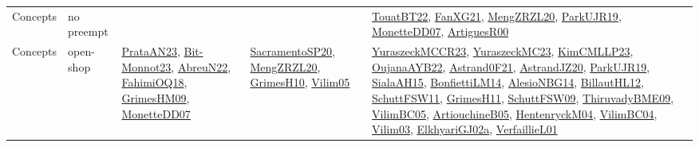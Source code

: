 {\begin{longtable}{lp{3cm}>{\raggedright}p{6cm}>{\raggedright}p{6cm}p{8cm}}
Concepts & no preempt &  &  & \href{papers/TouatBT22.pdf}{TouatBT22}\cite{TouatBT22}, \href{articles/FanXG21.pdf}{FanXG21}\cite{FanXG21}, \href{articles/MengZRZL20.pdf}{MengZRZL20}\cite{MengZRZL20}, \href{papers/ParkUJR19.pdf}{ParkUJR19}\cite{ParkUJR19}, \href{papers/MonetteDD07.pdf}{MonetteDD07}\cite{MonetteDD07}, \href{articles/ArtiguesR00.pdf}{ArtiguesR00}\cite{ArtiguesR00}\\
Concepts & open-shop & \href{articles/PrataAN23.pdf}{PrataAN23}\cite{PrataAN23}, \href{papers/Bit-Monnot23.pdf}{Bit-Monnot23}\cite{Bit-Monnot23}, \href{articles/AbreuN22.pdf}{AbreuN22}\cite{AbreuN22}, \href{articles/FahimiOQ18.pdf}{FahimiOQ18}\cite{FahimiOQ18}, \href{papers/GrimesHM09.pdf}{GrimesHM09}\cite{GrimesHM09}, \href{papers/MonetteDD07.pdf}{MonetteDD07}\cite{MonetteDD07} & \href{articles/SacramentoSP20.pdf}{SacramentoSP20}\cite{SacramentoSP20}, \href{articles/MengZRZL20.pdf}{MengZRZL20}\cite{MengZRZL20}, \href{papers/GrimesH10.pdf}{GrimesH10}\cite{GrimesH10}, \href{papers/Vilim05.pdf}{Vilim05}\cite{Vilim05} & \href{articles/YuraszeckMCCR23.pdf}{YuraszeckMCCR23}\cite{YuraszeckMCCR23}, \href{papers/YuraszeckMC23.pdf}{YuraszeckMC23}\cite{YuraszeckMC23}, \href{papers/KimCMLLP23.pdf}{KimCMLLP23}\cite{KimCMLLP23}, \href{papers/OujanaAYB22.pdf}{OujanaAYB22}\cite{OujanaAYB22}, \href{papers/Astrand0F21.pdf}{Astrand0F21}\cite{Astrand0F21}, \href{articles/AstrandJZ20.pdf}{AstrandJZ20}\cite{AstrandJZ20}, \href{papers/ParkUJR19.pdf}{ParkUJR19}\cite{ParkUJR19}, \href{papers/SialaAH15.pdf}{SialaAH15}\cite{SialaAH15}, \href{papers/BonfiettiLM14.pdf}{BonfiettiLM14}\cite{BonfiettiLM14}, \href{papers/AlesioNBG14.pdf}{AlesioNBG14}\cite{AlesioNBG14}, \href{papers/BillautHL12.pdf}{BillautHL12}\cite{BillautHL12}, \href{articles/SchuttFSW11.pdf}{SchuttFSW11}\cite{SchuttFSW11}, \href{papers/GrimesH11.pdf}{GrimesH11}\cite{GrimesH11}, \href{papers/SchuttFSW09.pdf}{SchuttFSW09}\cite{SchuttFSW09}, \href{papers/ThiruvadyBME09.pdf}{ThiruvadyBME09}\cite{ThiruvadyBME09}, \href{articles/VilimBC05.pdf}{VilimBC05}\cite{VilimBC05}, \href{papers/ArtiouchineB05.pdf}{ArtiouchineB05}\cite{ArtiouchineB05}, \href{papers/HentenryckM04.pdf}{HentenryckM04}\cite{HentenryckM04}, \href{papers/VilimBC04.pdf}{VilimBC04}\cite{VilimBC04}, \href{papers/Vilim03.pdf}{Vilim03}\cite{Vilim03}, \href{papers/ElkhyariGJ02a.pdf}{ElkhyariGJ02a}\cite{ElkhyariGJ02a}, \href{papers/VerfaillieL01.pdf}{VerfaillieL01}\cite{VerfaillieL01}\\

\end{longtable}}
